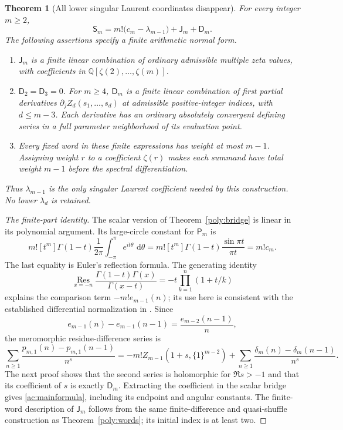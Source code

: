 \documentclass[11pt,a4paper]{article}
\numberwithin{equation}{section}
\newtheorem{theorem}{Theorem}[section]
\theoremstyle{definition}
\theoremstyle{remark}
\newcommand{\dd}{\,\mathrm d}
\newcommand{\Q}{\mathbb Q}
\begin{document}
\begin{theorem}[All lower singular Laurent coordinates disappear]
\label{ac:main}
For every integer $m\ge2$,
\begin{equation}\label{ac:mainformula}
 \boxed{\displaystyle
 \mathsf S_m=m!\bigl(c_m-\lambda_{m-1}\bigr)
                 +\mathsf J_m+\mathsf D_m.}
\end{equation}
The following assertions specify a finite arithmetic normal form.
\begin{enumerate}
 \item $\mathsf J_m$ is a finite linear combination of ordinary
 admissible multiple zeta values, with coefficients in
 $\Q[\zeta(2),\ldots,\zeta(m)]$.
 \item $\mathsf D_2=\mathsf D_3=0$. For $m\ge4$, $\mathsf D_m$
 is a finite linear combination of first partial derivatives
 $\partial_j Z_d(s_1,\ldots,s_d)$ at admissible positive-integer
 indices, with $d\le m-3$. Each derivative has an ordinary
 absolutely convergent defining series in a full parameter
 neighborhood of its evaluation point.
 \item Every fixed word in these finite expressions has weight
 at most $m-1$. Assigning weight $r$ to a coefficient $\zeta(r)$
 makes each summand have total weight $m-1$ before the spectral
 differentiation.
\end{enumerate}
Thus $\lambda_{m-1}$ is the only singular Laurent coefficient
needed by this construction. No lower $\lambda_d$ is retained.
\end{theorem}

\begin{proof}[The finite-part identity]
The scalar version of Theorem~\ref{poly:bridge} is linear in its
polynomial argument. Its large-circle constant for $\mathsf P_m$ is
\[
 m![t^m]\Gamma(1-t)\frac1{2\pi}
       \int_{-\pi}^{\pi}e^{it\theta}\,\dd\theta
 =m![t^m]\Gamma(1-t)\frac{\sin\pi t}{\pi t}
 =m!c_m.
\]
The last equality is Euler's reflection formula. The generating
identity
\[
 \operatorname*{Res}_{x=-n}
 \frac{\Gamma(1-t)\Gamma(x)}{\Gamma(x-t)}
       =-t\prod_{k=1}^n(1+t/k)
\]
explains the comparison term $-m!e_{m-1}(n)$; its use here is
consistent with the established differential normalization in
\cite{Fifth}. Since
\[
 e_{m-1}(n)-e_{m-1}(n-1)=\frac{e_{m-2}(n-1)}n,
\]
the meromorphic residue-difference series is
\begin{equation}\label{ac:Dsplit}
 \sum_{n\ge1}\frac{p_{m,1}(n)-p_{m,1}(n-1)}{n^s}
 =-m!Z_{m-1}(1+s,\{1\}^{m-2})
   +\sum_{n\ge1}\frac{\delta_m(n)-\delta_m(n-1)}{n^s}.
\end{equation}
The next proof shows that the second series is holomorphic for
$\Re s>-1$ and that its coefficient of $s$ is exactly
$\mathsf D_m$. Extracting the coefficient in the scalar bridge
gives \eqref{ac:mainformula}, including its endpoint and angular
constants. The finite-word description of $\mathsf J_m$ follows
from the same finite-difference and quasi-shuffle construction as
Theorem~\ref{poly:words}; its initial index is at least two.
\end{proof}
\end{document}
